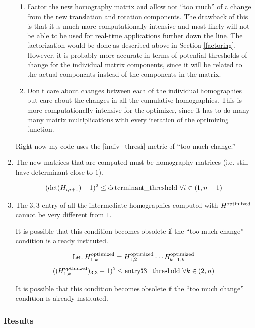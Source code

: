 \documentclass{article}
\begin{document}
\begin{enumerate}
\begin{enumerate}
\item Factor the new homography matrix and allow not ``too much'' of a change
from the new translation and rotation components. The drawback of this is that
it is much more computationally intensive and most likely will not be able to
be used for real-time applications further down the line. The factorization
would be done as described above in Section \ref{factoring}. However, it is
probably more accurate in terms of potential thresholds of change for the
individual matrix components, since it will be related to the actual components
instead of the components in the matrix. 

\item Don't care about changes between each of the individual homographies but
care about the changes in all the cumulative homographies. This is more
computationally intensive for the optimizer, since it has to do many many
matrix multiplications with every iteration of the optimizing function.  

\end{enumerate} 

Right now my code uses the \ref{indiv_thresh} metric of ``too much change.''

\item The new matrices that are computed must be homography matrices (i.e.
still have determinant close to $1$).

\[(\det(H_{i, i+1}) - 1)^2 \leq \textnormal{determinant\_threshold } \forall i \in (1, n-1)\] 

\item The $3, 3$ entry of all the intermediate homographies computed with
$H^{\textnormal{optimized}}$ cannot be very different from $1$.

It is possible that this condition becomes obsolete if the ``too much
change'' condition is already instituted. 

\[\textnormal{Let } H_{1, k}^{\textnormal{optimized}} = H_{1, 2}^{\textnormal{optimized}} \cdots H_{k - 1, k}^{\textnormal{optimized}}\]
\[((H_{1, k}^{\textnormal{optimized}})_{3, 3} - 1)^2 \leq \textnormal{entry33\_threshold } \forall k \in (2, n)\]

It is possible that this condition becomes obsolete if the ``too much
change'' condition is already instituted. 

\end{enumerate}

\subsubsection{Results}
\end{document}
